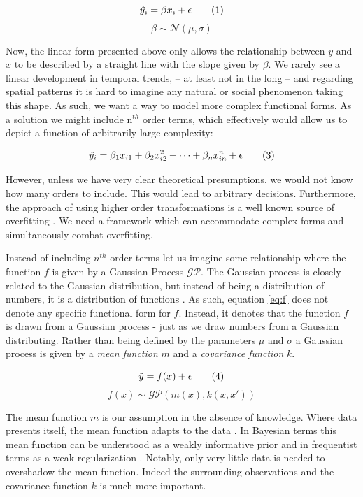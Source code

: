 \documentclass[a4paper]{article}
\begin{document}
\[
\Tilde{y_i} = \beta x_i + \epsilon  \tag{1} \label{eq:lin}
\]
\[
\beta \sim \mathcal{N}(\mu,\sigma)  \tag{2} \label{eq:beta}
\]

Now, the linear form presented above only allows the relationship between $y$ and $x$ to be described by a straight line with the slope given by $\beta$. We rarely see a linear development in temporal trends, -- at least not in the long -- and regarding spatial patterns it is hard to imagine any natural or social phenomenon taking this shape. As such, we want a way to model more complex functional forms. As a solution we might include n$^{th}$ order terms, which effectively would allow us to depict a function of arbitrarily large complexity:\par

\[
\Tilde{y_i} = \beta_1 x_{i1} + \beta_2 x_{i2}^2 + \dots + \beta_n x_{in}^n + \epsilon  \tag{3} \label{eq:orders}
\]

However, unless we have very clear theoretical presumptions, we would not know how many orders to include. This would lead to arbitrary decisions. Furthermore, the approach of using higher order transformations is a well known source of overfitting \citep[2]{williams2006gaussian}. We need a framework which can accommodate complex forms and simultaneously combat overfitting.\par

Instead of including $n^{th}$ order terms let us imagine some relationship where the function $f$ is given by a Gaussian Process $\mathcal{GP}$. The Gaussian process is closely related to the Gaussian distribution, but instead of being a distribution of numbers, it is a distribution of functions \citep[13-15]{williams2006gaussian}. As such, equation \ref{eq:f} does not denote any specific functional form for $f$. Instead, it denotes that the function $f$ is drawn from a Gaussian process - just as we draw numbers from a Gaussian distributing. Rather than being defined by the parameters $\mu$ and $\sigma$ a Gaussian process is given by a \emph{mean function} $m$ and a \emph{covariance function} $k$.\par

\[
\Tilde{y} = f(x) + \epsilon  \tag{4} \label{eq:y}
\]
\[
f(x) \sim \mathcal{GP}(m(x),k(x,x'))  \tag{5} \label{eq:f}
\]

The mean function $m$ is our assumption in the absence of knowledge. Where data presents itself, the mean function adapts to the data \citep[3-4]{williams2006gaussian}. In Bayesian terms this mean function can be understood as a weakly informative prior and in frequentist terms as a weak regularization \citep[35]{Mcelreath_2018}. Notably, only very little data is needed to overshadow the mean function. Indeed the surrounding observations and the covariance function $k$ is much more important.\par
\end{document}
